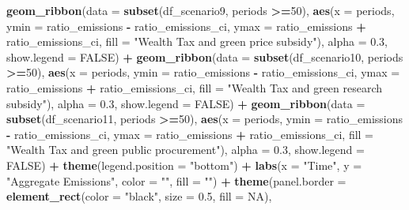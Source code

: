 \documentclass[
]{article}
\newenvironment{Shaded}{\begin{snugshade}}{\end{snugshade}}
\newcommand{\AttributeTok}[1]{\textcolor[rgb]{0.13,0.29,0.53}{#1}}
\newcommand{\ConstantTok}[1]{\textcolor[rgb]{0.56,0.35,0.01}{#1}}
\newcommand{\DecValTok}[1]{\textcolor[rgb]{0.00,0.00,0.81}{#1}}
\newcommand{\FloatTok}[1]{\textcolor[rgb]{0.00,0.00,0.81}{#1}}
\newcommand{\FunctionTok}[1]{\textcolor[rgb]{0.13,0.29,0.53}{\textbf{#1}}}
\newcommand{\NormalTok}[1]{#1}
\newcommand{\SpecialCharTok}[1]{\textcolor[rgb]{0.81,0.36,0.00}{\textbf{#1}}}
\newcommand{\StringTok}[1]{\textcolor[rgb]{0.31,0.60,0.02}{#1}}
\begin{document}
\begin{Shaded}
\begin{Highlighting}[]
  \FunctionTok{geom\_ribbon}\NormalTok{(}\AttributeTok{data =} \FunctionTok{subset}\NormalTok{(df\_scenario9, periods }\SpecialCharTok{\textgreater{}=}\DecValTok{50}\NormalTok{), }\FunctionTok{aes}\NormalTok{(}\AttributeTok{x =}\NormalTok{ periods, }\AttributeTok{ymin =}\NormalTok{ ratio\_emissions }\SpecialCharTok{{-}}\NormalTok{ ratio\_emissions\_ci, }\AttributeTok{ymax =}\NormalTok{ ratio\_emissions }\SpecialCharTok{+}\NormalTok{ ratio\_emissions\_ci, }\AttributeTok{fill =} \StringTok{"Wealth Tax and green price subsidy"}\NormalTok{), }\AttributeTok{alpha =} \FloatTok{0.3}\NormalTok{, }\AttributeTok{show.legend =} \ConstantTok{FALSE}\NormalTok{) }\SpecialCharTok{+}
  \FunctionTok{geom\_ribbon}\NormalTok{(}\AttributeTok{data =} \FunctionTok{subset}\NormalTok{(df\_scenario10, periods }\SpecialCharTok{\textgreater{}=}\DecValTok{50}\NormalTok{), }\FunctionTok{aes}\NormalTok{(}\AttributeTok{x =}\NormalTok{ periods, }\AttributeTok{ymin =}\NormalTok{ ratio\_emissions }\SpecialCharTok{{-}}\NormalTok{ ratio\_emissions\_ci, }\AttributeTok{ymax =}\NormalTok{ ratio\_emissions }\SpecialCharTok{+}\NormalTok{ ratio\_emissions\_ci, }\AttributeTok{fill =} \StringTok{"Wealth Tax and green research subsidy"}\NormalTok{), }\AttributeTok{alpha =} \FloatTok{0.3}\NormalTok{, }\AttributeTok{show.legend =} \ConstantTok{FALSE}\NormalTok{) }\SpecialCharTok{+}
  \FunctionTok{geom\_ribbon}\NormalTok{(}\AttributeTok{data =} \FunctionTok{subset}\NormalTok{(df\_scenario11, periods }\SpecialCharTok{\textgreater{}=}\DecValTok{50}\NormalTok{), }\FunctionTok{aes}\NormalTok{(}\AttributeTok{x =}\NormalTok{ periods, }\AttributeTok{ymin =}\NormalTok{ ratio\_emissions }\SpecialCharTok{{-}}\NormalTok{ ratio\_emissions\_ci, }\AttributeTok{ymax =}\NormalTok{ ratio\_emissions }\SpecialCharTok{+}\NormalTok{ ratio\_emissions\_ci, }\AttributeTok{fill =} \StringTok{"Wealth Tax and green public procurement"}\NormalTok{), }\AttributeTok{alpha =} \FloatTok{0.3}\NormalTok{, }\AttributeTok{show.legend =} \ConstantTok{FALSE}\NormalTok{) }\SpecialCharTok{+}
  \FunctionTok{theme}\NormalTok{(}\AttributeTok{legend.position =} \StringTok{"bottom"}\NormalTok{) }\SpecialCharTok{+}
  \FunctionTok{labs}\NormalTok{(}\AttributeTok{x =} \StringTok{"Time"}\NormalTok{, }\AttributeTok{y =} \StringTok{"Aggregate Emissions"}\NormalTok{, }\AttributeTok{color =} \StringTok{""}\NormalTok{, }\AttributeTok{fill =} \StringTok{""}\NormalTok{) }\SpecialCharTok{+}
  \FunctionTok{theme}\NormalTok{(}\AttributeTok{panel.border =} \FunctionTok{element\_rect}\NormalTok{(}\AttributeTok{color =} \StringTok{"black"}\NormalTok{, }\AttributeTok{size =} \FloatTok{0.5}\NormalTok{, }\AttributeTok{fill =} \ConstantTok{NA}\NormalTok{),}

\end{Highlighting}
\end{Shaded}
\end{document}
